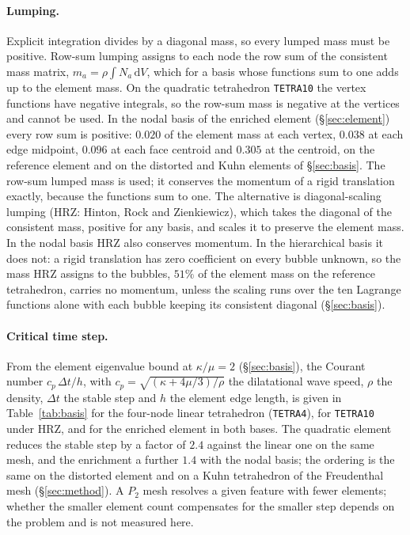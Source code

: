 \documentclass[11pt]{article}
\newcommand{\diff}{\,\mathrm{d}}
\newcommand{\code}[1]{\texttt{#1}}
\theoremstyle{definition}
\theoremstyle{plain}
\begin{document}
\paragraph{Lumping.} Explicit integration divides by a diagonal mass, so
every lumped mass must be positive. Row-sum lumping assigns to each node
the row sum of the consistent mass matrix, $m_a = \rho \int N_a \diff V$,
which for a basis whose functions sum to one adds up to the element mass.
On the quadratic tetrahedron
\code{TETRA10} the vertex functions have negative integrals, so the
row-sum mass is negative at the vertices and cannot be used. In the nodal
basis of the enriched element (\S\ref{sec:element}) every row sum is
positive: $0.020$ of the element mass at each vertex, $0.038$ at each edge
midpoint, $0.096$ at each face centroid and $0.305$ at the centroid, on the
reference element and on the distorted and Kuhn elements of
\S\ref{sec:basis}. The row-sum lumped mass is used; it conserves the
momentum of a rigid translation exactly, because the functions sum to one.
The alternative is diagonal-scaling lumping \citep{HintonRockZienkiewicz:1976}
(HRZ: Hinton, Rock and Zienkiewicz), which takes the diagonal of the
consistent mass, positive for any basis, and scales it to preserve the
element mass. In the nodal basis HRZ also conserves momentum. In the
hierarchical basis it does not: a rigid translation has zero coefficient on
every bubble unknown, so the mass HRZ assigns to the bubbles, $51\%$ of the
element mass on the reference tetrahedron, carries no momentum, unless the
scaling runs over the ten Lagrange functions alone with each bubble keeping
its consistent diagonal (\S\ref{sec:basis}).

\paragraph{Critical time step.} From the element eigenvalue bound at
$\kappa/\mu = 2$ (\S\ref{sec:basis}), the Courant number $c_p\,\Delta t/h$,
with $c_p = \sqrt{(\kappa + 4\mu/3)/\rho}$ the dilatational wave speed,
$\rho$ the density, $\Delta t$ the stable step and $h$ the element edge
length, is given in Table~\ref{tab:basis} for the four-node linear
tetrahedron (\code{TETRA4}), for \code{TETRA10} under HRZ, and for the
enriched element in both bases. The quadratic element reduces the stable step
by a factor of $2.4$ against the linear one on the same mesh, and the
enrichment a further $1.4$ with the nodal basis; the ordering is the same on
the distorted element and on a Kuhn tetrahedron of the Freudenthal mesh
(\S\ref{sec:method}). A $P_2$ mesh resolves a given feature with fewer
elements; whether the smaller element count compensates for the smaller step
depends on the problem and is not measured here.
\end{document}
